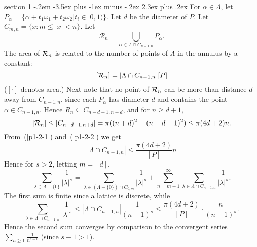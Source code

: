 \documentclass[12pt]{article}
\makeatletter
\theoremstyle{norm}
\newcommand{\rc}[1]{\frac{1}{#1}}
\newcommand{\subeq}[0]{\subseteq}
\newcommand{\al}[0]{\alpha}
\newcommand{\la}[0]{\lambda}
\newcommand{\La}[0]{\Lambda}
\newcommand{\ce}[1]{\left\lceil {#1}\right\rceil}
\newenvironment{problem}{\@startsection
       {section}
       {1}
       {-.2em}
       {-3.5ex plus -1ex minus -.2ex}
       {2.3ex plus .2ex}
       {\pagebreak[3]%
       \large\bf\noindent{Problem }
       }
       }
       {%
       }
\makeatother
\begin{document}
\begin{problem}{\it }
For $\al\in \La$, let $P_{\al}=\{\al+t_1\omega_1+t_2\omega_2|t_i\in [0,1)\}$. Let $d$ be the diameter of $P$. Let $C_{m,n}=\{x:m\leq |x|< n\}$. Let
\[
\mathcal R_n=\bigcup_{\al\in \La\cap C_{n-1,n}}P_{\al}.
\]
The area of ${\cal R}_n$ is related to the number of points of $\La$ in the annulus
by a constant:
\begin{equation}\label{p1-2-1}
[{\cal R}_n]=|\La\cap C_{n-1,n}|[P]
\end{equation}
($[\cdot ]$ denotes area.) 
Next note that no point of ${\cal{R}}_n$ can be more than distance $d$ away from $C_{n-1,n}$, since each $P_{\al}$ has diameter $d$ and contains the point $\al\in C_{n-1,n}$. Hence $R_n\subeq C_{n-d-1,n+d}$, and for $n\geq d+1$,
\begin{equation}\label{p1-2-2}
[{\cal R}_n]\leq [C_{n-d-1,n+d}]=\pi((n+d)^2-%
(n-d-1)^2)\leq\pi(4d+2)n.
\end{equation}
From~(\ref{p1-2-1}) and~(\ref{p1-2-2}) we get
\[
|\La\cap C_{n-1,n}|\leq \frac{\pi(4d+2)}{[P]}n
\]
Hence for $s>2$, letting $m=\ce{d}$,
\[
\sum_{\la\in \La-\{0\}} \frac{1}{|\la|^s}=\sum_{\la\in (\La-\{0\})\cap C_{0,m}}\rc{|\la|^s} +\sum_{n=m+1}^{\infty}\sum_{\la\in \La\cap C_{n-1,n}} \rc{|\la|^s}.
\]
The first sum is finite since a lattice is discrete, while
\[
\sum_{\la\in \La\cap C_{n-1,n}} \rc{|\la|^s}\leq 
|\La\cap C_{n-1,n}|\rc{(n-1)^s}
\leq \frac{\pi(4d+2)}{[P]}\cdot \frac{n}{(n-1)^s}.
\]
Hence the second sum converges by comparison to the convergent series $\sum_{n\geq 1} \rc{n^{s-1}}$ (since $s-1>1$).

\end{problem}
\end{document}
